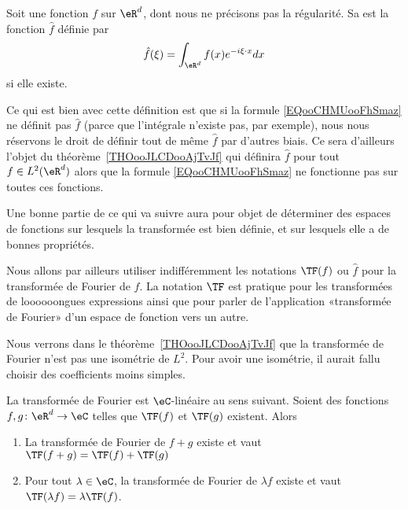 

\begin{definition}      \label{DEFooRIXGooECoIbx}
	Soit une fonction \( f\) sur \( \eR^d\), dont nous ne précisons pas la régularité. Sa  est la fonction \( \hat f\) définie par
	\begin{equation}        \label{EQooCHMUooFhSmaz}
		\hat f(\xi)=\int_{\eR^d} f(x) e^{-i\xi\cdot x}dx
	\end{equation}
	si elle existe.
\end{definition}

\begin{normaltext}
	Ce qui est bien avec cette définition est que si la formule \eqref{EQooCHMUooFhSmaz} ne définit pas \( \hat f\) (parce que l'intégrale n'existe pas, par exemple), nous nous réservons le droit de définir tout de même \( \hat f\) par d'autres biais. Ce sera d'ailleurs l'objet du théorème~\ref{THOooJLCDooAjTvJf} qui définira \( \hat f\) pour tout \( f\in L^2(\eR^d)\) alors que la formule \eqref{EQooCHMUooFhSmaz} ne fonctionne pas sur toutes ces fonctions.

	Une bonne partie de ce qui va suivre aura pour objet de déterminer des espaces de fonctions sur lesquels la transformée est bien définie, et sur lesquels elle a de bonnes propriétés.

	Nous allons par ailleurs utiliser indifféremment les notations \( \TF(f)\) ou \( \hat f\) pour la transformée de Fourier de \( f\). La notation \( \TF\) est pratique pour les transformées de loooooongues expressions ainsi que pour parler de l'application «transformée de Fourier» d'un espace de fonction vers un autre.
\end{normaltext}

\begin{normaltext}
	Nous verrons dans le théorème~\ref{THOooJLCDooAjTvJf} que la transformée de Fourier n'est pas une isométrie de \( L^2\). Pour avoir une isométrie, il aurait fallu choisir des coefficients moins simples.
\end{normaltext}

\begin{proposition}
	La transformée de Fourier est \( \eC\)-linéaire au sens suivant. Soient des fonctions \( f,g\colon \eR^d\to \eC\) telles que \( \TF(f)\) et \( \TF(g)\) existent. Alors
	\begin{enumerate}
		\item
		      La transformée de Fourier de \( f+g\) existe et vaut \( \TF(f+g)=\TF(f)+\TF(g)\)
		\item
		      Pour tout \( \lambda\in \eC\), la transformée de Fourier de \( \lambda f\) existe et vaut \( \TF(\lambda f)=\lambda\TF(f)\).
	\end{enumerate}
\end{proposition}

